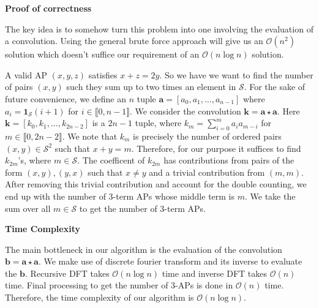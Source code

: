 \textbf{Proof of correctness}

The key idea is to somehow turn this problem into one involving the evaluation of a convolution. Using the general brute force approach will give us an $\mathcal{O}(n^2)$ solution which doesn't suffice our requirement of an $\mathcal{O}(n\log{n})$ solution.

A valid AP $(x,y,z)$ satisfies $x+z=2y$. So we have we want to find the number of pairs $(x,y)$ such they sum up to two times an element in $\mathcal{S}$. For the sake of future convenience, we define an $n$ tuple $\mathbf{a}=[a_0, a_1, \ldots, a_{n-1}]$ where $a_i = \mathbf{1}_{\mathcal{S}}(i+1)$ for $i\in \lBrack 0, n-1\rBrack$. We consider the convolution $\mathbf{k}=\mathbf{a}\star \mathbf{a}$. Here $\mathbf{k}=[k_0, k_1, \ldots, k_{2n-2}]$ is a $2n-1$ tuple, where $k_m = \sum_{i=0}^m a_i a_{m-i}$ for $m\in \lBrack 0, 2n-2\rBrack$. We note that $k_m$ is precisely the number of ordered pairs $(x,y)\in \mathcal{S}^2$ such that $x+y = m$. Therefore, for our purpose it suffices to find $k_{2m}$'s, where $m\in \mathcal{S}$. The coefficent of $k_{2m}$ has contributions from pairs of the form $(x,y),(y,x)$ such that $x\neq y$ and a trivial contribution from $(m,m)$. After removing this trivial contribution and account for the double counting, we end up with the number of $3$-term APs whose middle term is $m$. We take the sum over all $m\in \mathcal{S}$ to get the number of $3$-term APs.

\textbf{Time Complexity}

The main bottleneck in our algorithm is the evaluation of the convolution $\mathbf{b} = \mathbf{a}\star \mathbf{a}$. We make use of discrete fourier transform and its inverse to evaluate the $\mathbf{b}$. Recursive DFT takes $\mathcal{O}(n\log{n})$ time and inverse DFT takes $\mathcal{O}(n)$ time. Final processing to get the number of $3$-APs is done in $\mathcal{O}(n)$ time. Therefore, the time complexity of our algorithm is $\mathcal{O}(n\log{n})$.